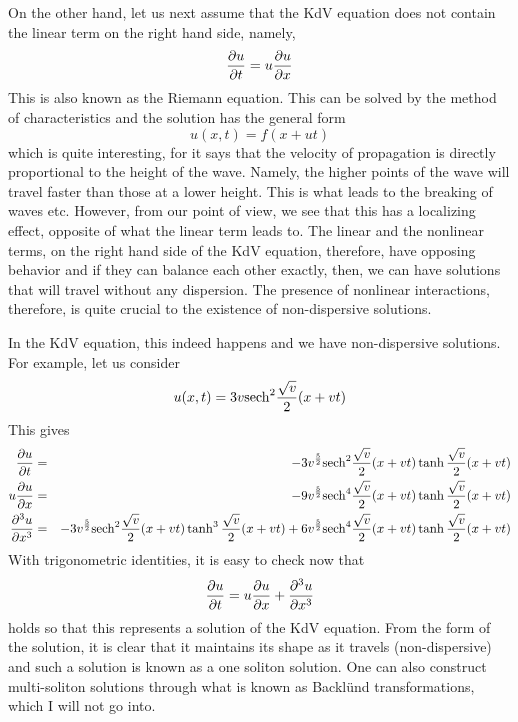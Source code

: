 \documentclass[a4paper,11pt]{article}
\begin{document}
On the other hand, let us next assume that the KdV equation does not
contain  the linear term on the right hand side, namely,
\begin{equation}
{\partial u\over \partial t} = u {\partial u\over \partial x}
\end{equation}
This is also known as the Riemann equation. This can be solved by the
method of characteristics and the solution has the general form
\begin{equation}
u(x,t) = f(x + u t)
\end{equation}
which is quite interesting, for it says that the velocity of
propagation is directly proportional to the height of the
wave. Namely, the higher points of the wave will travel faster than
those at a lower height. This is what leads to the breaking of waves
etc. However, from our point of view, we see that this has a
localizing effect,  opposite of  what the linear
term leads to. The linear and the nonlinear terms, on the right hand
side of the KdV equation, therefore, have opposing behavior and if
they can balance each other exactly, then, we can have solutions that
will travel without any dispersion. The presence of nonlinear
interactions, therefore, is quite crucial to the existence of
non-dispersive solutions.

In the KdV equation, this indeed happens and we have non-dispersive
solutions. For example, let us consider
\begin{equation}
u(x,t) = 3 v {\rm sech}^{2} {\sqrt{v}\over 2} (x + vt)
\end{equation}
This gives
\begin{eqnarray*}
{\partial u\over \partial t} & = & -3 v^{5\over 2} {\rm sech}^{2}
{\sqrt{v}\over 2} (x + vt) \tanh {\sqrt{v}\over 2} (x + vt)\\
u {\partial u\over \partial x} & = & - 9 v^{5\over 2} {\rm sech}^{4}
{\sqrt{v}\over 2} (x + vt) \tanh {\sqrt{v}\over 2} (x + vt)\\
{\partial^{3} u\over \partial x^{3}} & = & - 3 v^{5\over 2} {\rm sech}^{2}
{\sqrt{v}\over 2} (x + vt) \tanh^{3} {\sqrt{v}\over 2} (x + vt) + 6
v^{5\over 2} {\rm sech}^{4} {\sqrt{v}\over 2} (x + vt) \tanh {\sqrt{v}\over
2} (x + vt)
\end{eqnarray*}
With trigonometric identities, it is easy to check now that
$$
{\partial u\over \partial t} = u {\partial u\over \partial x} +
{\partial^{3} u\over \partial x^{3}}
$$
holds so that this represents a solution of the KdV equation. From the
form of the solution, it is clear that it maintains its shape as it
travels (non-dispersive) and such a solution is known as a one soliton
solution. One can also construct multi-soliton solutions through what
is known as Backl\"{u}nd transformations, which I will not go into.
\end{document}

